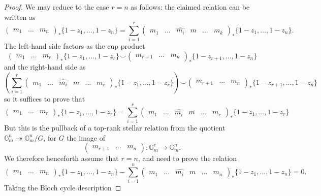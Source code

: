 \documentclass[10pt,a4paper]{amsart}
\begin{document}
    \begin{proof}
        We may reduce to the case $r=n$ as follows: the claimed relation can be written as 
        \[
        \begin{pmatrix}m_1&\ldots & m_n\end{pmatrix}_* \{1-z_1,\ldots, 1-z_n\} = \sum_{i=1}^r \begin{pmatrix}m_1&\ldots& \hat{m_i} & m & \ldots   & m_k\end{pmatrix}_* \{1-z_1,\ldots, 1-z_n\}.
        \]
        The left-hand side factors as the cup product
        \[
        \begin{pmatrix}m_1&\ldots & m_r\end{pmatrix}_* \{1-z_1,\ldots, 1-z_r\} \smile \begin{pmatrix}m_{r+1}&\ldots & m_n\end{pmatrix}_* \{1-z_{r+1},\ldots, 1-z_n\} 
        \]
        and the right-hand side as 
        \[
        \left(\sum_{i=1}^r \begin{pmatrix}m_1&\ldots& \hat{m_i} & m & \ldots   & m_r\end{pmatrix}_* \{1-z_1,\ldots, 1-z_r\}\right)
        \smile \begin{pmatrix}m_{r+1}&\ldots & m_n\end{pmatrix}_* \{1-z_{r+1},\ldots, 1-z_n\} 
        \]
        so it suffices to prove that 
        \[
        \begin{pmatrix}m_1&\ldots & m_r\end{pmatrix}_* \{1-z_1,\ldots, 1-z_r\} = \sum_{i=1}^r \begin{pmatrix}m_1&\ldots& \hat{m_i} & m & \ldots   & m_r\end{pmatrix}_* \{1-z_1,\ldots, 1-z_r\}
        \]
        But this is the pullback of a top-rank stellar relation from the quotient $\mathbb{G}_m^n\twoheadrightarrow \mathbb{G}_m^n/G$, for $G$ the image of 
        \[
        \begin{pmatrix}m_{r+1}&\ldots & m_n\end{pmatrix}: \mathbb{G}_m^r \to \mathbb{G}_m^n.
        \]
        We therefore henceforth assume that $r=n$, and need to prove the relation 
        \[
        \begin{pmatrix}m_1&\ldots & m_n\end{pmatrix}_* \{1-z_1,\ldots, 1-z_n\} - \sum_{i=1}^n \begin{pmatrix}m_1&\ldots& \hat{m_i} & m & \ldots   & m_n\end{pmatrix}_* \{1-z_1,\ldots, 1-z_n\} =0.
        \]
        Taking the Bloch cycle description

\end{proof}
\end{document}
